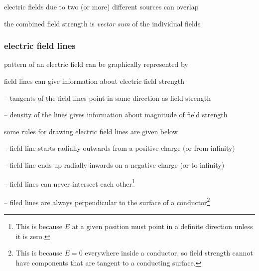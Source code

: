 \cmt  electric fields due to two (or more) different sources can overlap

the combined field strength is \emph{vector sum} of the individual fields

%





\subsubsection{electric field lines}

pattern of an electric field can be graphically represented by 

\cmt field lines can give information about electric field strength

\begin{compactitem}
	\item[--] tangents of the field lines point in same direction as field strength
	
	\item[--] density of the lines gives information about magnitude of field strength
\end{compactitem}

\cmt some rules for drawing electric field lines are given below

\begin{compactitem}
	\item[--] field line starts radially outwards from a positive charge (or from infinity)
	
	\item[--] field line ends up radially inwards on a negative charge (or to infinity)
	
	\item[--] field lines can never intersect each other\footnote{This is because $E$ at a given position must point in a definite direction unless it is zero.}
	
	\item[--] filed lines are always perpendicular to the surface of a conductor\footnote{This is because $E=0$ everywhere inside a conductor, so field strength cannot have components that are tangent to a conducting surface.}
\end{compactitem}




